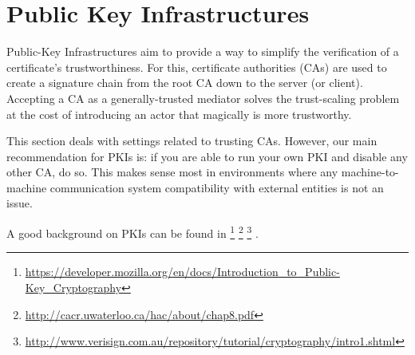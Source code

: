 \section{Public Key Infrastructures}
\label{section:PKIs}

Public-Key Infrastructures aim to provide a way to simplify the verification of
a certificate's trustworthiness.  For this, certificate authorities (CAs) are
used to create a signature chain from the root CA down to the server (or client).
Accepting a CA as a generally-trusted mediator solves the trust-scaling problem
at the cost of introducing an actor that magically is more trustworthy.

This section deals with settings related to trusting CAs. However, our main
recommendation for PKIs is: if you are able to run your own PKI and disable
any other CA, do so. This makes sense most in environments where any machine-to-machine
communication system compatibility with external entities is not an issue.

A good background on PKIs can be found in 
\footnote{\url{https://developer.mozilla.org/en/docs/Introduction_to_Public-Key_Cryptography}}
\footnote{\url{http://cacr.uwaterloo.ca/hac/about/chap8.pdf}}
\footnote{\url{http://www.verisign.com.au/repository/tutorial/cryptography/intro1.shtml}}
.



